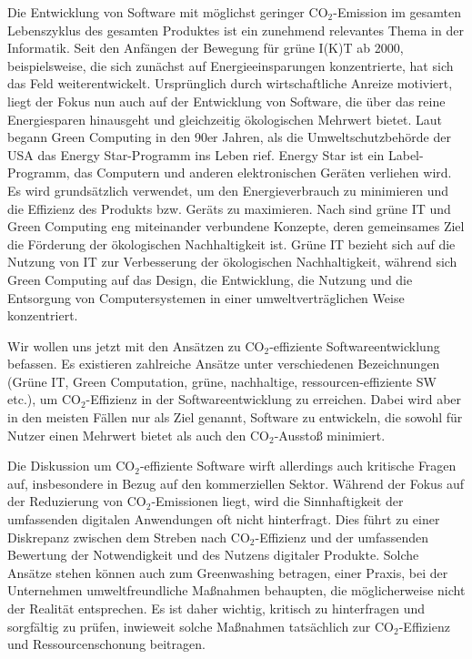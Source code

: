 \documentclass{article}
\begin{document}
Die Entwicklung von Software mit möglichst geringer CO$_2$-Emission im gesamten  Lebenszyklus des gesamten Produktes ist ein zunehmend relevantes Thema in der Informatik. Seit den Anfängen der Bewegung für grüne I(K)T  ab 2000, beispielsweise\cite{murugesan_harnessing_2008,uddin_energy_2012}, die sich zunächst auf Energieeinsparungen konzentrierte, hat sich das Feld weiterentwickelt. Ursprünglich durch wirtschaftliche Anreize motiviert, liegt der Fokus nun auch auf der Entwicklung von Software, die über das reine Energiesparen hinausgeht und gleichzeitig ökologischen Mehrwert bietet. Laut \cite{singh_green_2016} begann
\glqq Green  Computing\grqq{}  in den 90er Jahren, als die Umweltschutzbehörde der USA das Energy Star-Programm ins Leben rief. Energy Star ist ein Label-Programm, das Computern und anderen elektronischen Geräten verliehen wird. Es wird grundsätzlich verwendet, um den Energieverbrauch zu minimieren und die Effizienz des Produkts bzw. Geräts zu maximieren. Nach \cite{paul_comprehensive_2023} sind grüne IT und Green  Computing eng miteinander verbundene Konzepte, deren gemeinsames Ziel die Förderung der ökologischen Nachhaltigkeit ist. Grüne IT bezieht sich auf die Nutzung von IT zur Verbesserung der ökologischen Nachhaltigkeit, während sich Green Computing auf das Design, die Entwicklung, die Nutzung und die Entsorgung von Computersystemen in einer umweltverträglichen Weise konzentriert.


Wir wollen uns jetzt mit den Ansätzen  zu CO$_2$-effiziente Softwareentwicklung befassen.
Es existieren zahlreiche Ansätze unter verschiedenen Bezeichnungen (Grüne IT, Green Computation, grüne, nachhaltige, ressourcen-effiziente SW etc.), um CO$_2$-Effizienz in der Softwareentwicklung zu erreichen. Dabei wird aber in den meisten Fällen nur als Ziel genannt, Software zu entwickeln, die sowohl für Nutzer einen Mehrwert bietet als auch den CO$_2$-Ausstoß minimiert.

Die Diskussion um CO$_2$-effiziente Software wirft allerdings auch kritische Fragen auf, insbesondere in Bezug auf den kommerziellen Sektor. Während der Fokus auf der Reduzierung von CO$_2$-Emissionen liegt, wird die Sinnhaftigkeit der umfassenden digitalen Anwendungen oft nicht hinterfragt. Dies führt zu einer Diskrepanz zwischen dem Streben nach CO$_2$-Effizienz und der umfassenden Bewertung der Notwendigkeit und des Nutzens digitaler Produkte. Solche Ansätze stehen können auch zum  Greenwashing betragen, einer Praxis, bei der Unternehmen umweltfreundliche Maßnahmen behaupten, die möglicherweise nicht der Realität entsprechen. 
Es ist daher wichtig, kritisch zu hinterfragen und sorgfältig zu prüfen, inwieweit solche Maßnahmen tatsächlich zur CO$_2$-Effizienz und Ressourcenschonung beitragen.
\end{document}
